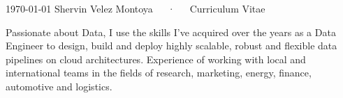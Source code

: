 \documentclass[11pt, a4paper]{awesome-cv}
\begin{document}
\makecvheader
\makecvfooter
{\today}
{Shervin Velez Montoya~~~·~~~Curriculum Vitae}
{}


\begin{cvparagraph}
    Passionate about Data, I use the skills I've acquired over the years as a Data Engineer to design, build and deploy highly scalable, robust and flexible data pipelines on cloud architectures.
    Experience of working with local and international teams in the fields of research, marketing, energy, finance, automotive and logistics.
\end{cvparagraph}





\end{document}
